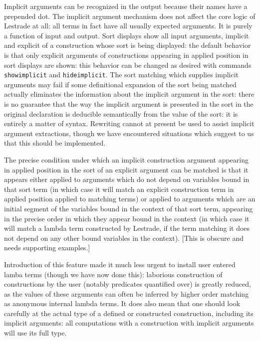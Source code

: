 \documentclass[12pt]{article}
\begin{document}
\begin{description}
Implicit arguments can be recognized in the output because their names have a prepended dot.    The implicit argument mechanism does not affect the core logic of Lestrade at all:
all terms in fact have all usually expected arguments.  It is purely a function of input and output.   Sort displays show all input arguments, implicit and explicit of a construction whose sort is being displayed:  the default behavior is that only explicit arguments of constructions appearing in applied position in sort displays are shown:  this behavior can be changed as desired with commands {\tt showimplicit} and {\tt hideimplicit}.  The sort matching which supplies implicit arguments may fail if some definitional expansion of the sort being matched actually eliminates the information about the implicit argument in the sort:  there is no guarantee that the way the implicit argument is presented in the sort in the original declaration is deducible semantically from the value of the sort:  it is entirely a matter of syntax.   Rewriting cannot at present be used to assist implicit argument extractions, though we have encountered situations which suggest to us that this should be implemented.

The precise condition under which an implicit construction argument appearing in applied position in the sort of an explicit argument
can be matched is that it appears either applied to arguments which do not depend on variables bound in that sort term (in which case it will match an explicit construction term in applied position applied to matching terms) or applied to arguments which are an initial segment of the variables bound in the context of that sort term, appearing in the precise order in which they appear bound in the context (in which case it will match a lambda term constructed by Lestrade, if the term matching it does not depend on any other bound variables in the context). [This is obscure and needs supporting examples.]

Introduction of this feature made it much less urgent to install user entered lamba terms (though we have now done this):  laborious construction of constructions by the user (notably predicates quantified over) is greatly reduced, as the values of these arguments can often be inferred by higher order matching as anonymous internal lambda terms.  It does also mean that one should look carefully at the actual type of a defined or constructed construction, including its implicit arguments:  all computations with a construction with implicit arguments will use its full type.


\end{description}
\end{document}
